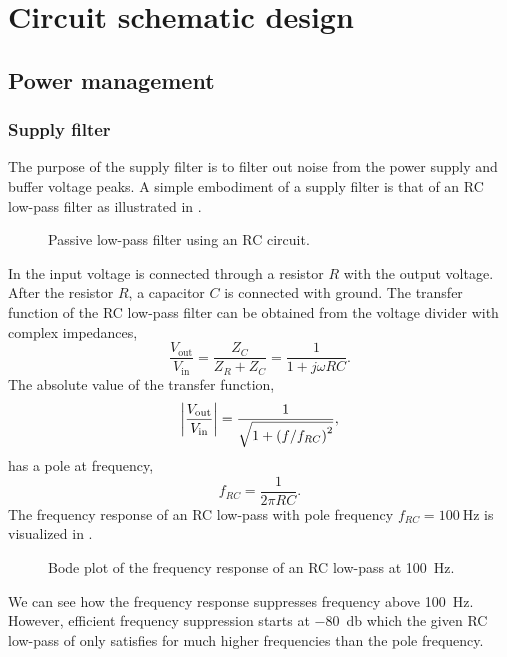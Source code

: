 \section{Circuit schematic design}

\subsection{Power management}

\subsubsection{Supply filter}

The purpose of the supply filter is to filter out noise from the power supply and buffer voltage peaks.
A simple embodiment of a supply filter is that of an RC low-pass filter as illustrated in .
\begin{figure}[H]
	\centering
	
	\caption{Passive low-pass filter using an RC circuit.}\label{fig:filter_lowpass}
\end{figure}
In  the input voltage is connected through a resistor $R$ with the output voltage.
After the resistor $R$, a capacitor $C$ is connected with ground.
The transfer function of the RC low-pass filter can be obtained from the voltage divider with complex impedances,
\begin{equation}
	\frac{V_\text{out}}{V_\text{in}}
	=\frac{Z_C}{Z_R+Z_C}
	=\frac{1}{1+j\omega RC}.
	\label{eq:transfer_filter_rc}
\end{equation}
The absolute value of the transfer function,
\begin{equation}
	\abs{\frac{V_\text{out}}{V_\text{in}}}
	=\frac{1}{\sqrt{1+\left(f/f_{RC}\right)^2}},
\end{equation}
has a pole at frequency,
\begin{equation}
	f_{RC}=\frac{1}{2\pi RC}.
\end{equation}
The frequency response of an RC low-pass with pole frequency $f_{RC}=\SI{100}{\hertz}$ is visualized in .
\begin{figure}[H]
	\centering
	
	\caption{Bode plot of the frequency response of an RC low-pass at \SI{100}{\hertz}.}\label{fig:bode_filter_rc}
\end{figure}
We can see how the frequency response suppresses frequency above \SI{100}{\hertz}.
However, efficient frequency suppression starts at \SI{-80}{\decibel} which the given RC low-pass of  only satisfies for much higher frequencies than the pole frequency.

